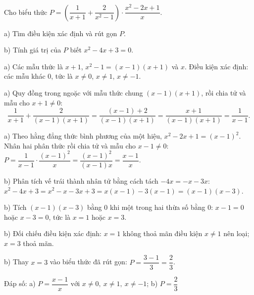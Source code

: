 \begin{problem}[8DS-PS-007]
Cho biểu thức $P = \left(\dfrac{1}{x + 1} + \dfrac{2}{x^2 - 1}\right) \cdot \dfrac{x^2 - 2x + 1}{x}$.

a) Tìm điều kiện xác định và rút gọn $P$.

b) Tính giá trị của $P$ biết $x^2 - 4x + 3 = 0$.

\begin{solution}
a) Các mẫu thức là $x + 1$, $x^2 - 1 = (x - 1)(x + 1)$ và $x$. Điều kiện xác định: các mẫu khác $0$, tức là $x \neq 0$, $x \neq 1$, $x \neq -1$.

a) Quy đồng trong ngoặc với mẫu thức chung $(x - 1)(x + 1)$, rồi chia tử và mẫu cho $x + 1 \neq 0$:
\[ \dfrac{1}{x + 1} + \dfrac{2}{(x - 1)(x + 1)} = \dfrac{(x - 1) + 2}{(x - 1)(x + 1)} = \dfrac{x + 1}{(x - 1)(x + 1)} = \dfrac{1}{x - 1}. \]

a) Theo hằng đẳng thức bình phương của một hiệu, $x^2 - 2x + 1 = (x - 1)^2$. Nhân hai phân thức rồi chia tử và mẫu cho $x - 1 \neq 0$: $P = \dfrac{1}{x - 1} \cdot \dfrac{(x - 1)^2}{x} = \dfrac{(x - 1)^2}{(x - 1)x} = \dfrac{x - 1}{x}$.

b) Phân tích vế trái thành nhân tử bằng cách tách $-4x = -x - 3x$: $x^2 - 4x + 3 = x^2 - x - 3x + 3 = x(x - 1) - 3(x - 1) = (x - 1)(x - 3)$.

b) Tích $(x - 1)(x - 3)$ bằng $0$ khi một trong hai thừa số bằng $0$: $x - 1 = 0$ hoặc $x - 3 = 0$, tức là $x = 1$ hoặc $x = 3$.

b) Đối chiếu điều kiện xác định: $x = 1$ không thoả mãn điều kiện $x \neq 1$ nên loại; $x = 3$ thoả mãn.

b) Thay $x = 3$ vào biểu thức đã rút gọn: $P = \dfrac{3 - 1}{3} = \dfrac{2}{3}$.

Đáp số: a) $\boxed{P = \dfrac{x - 1}{x} \text{ với } x \neq 0,\ x \neq 1,\ x \neq -1}$; b) $\boxed{P = \dfrac{2}{3}}$
\end{solution}
\end{problem}

